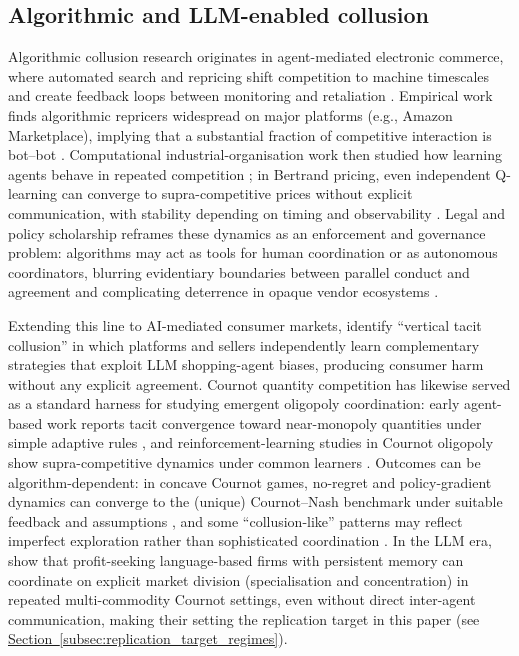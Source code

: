 \documentclass[11pt, a4paper]{article}
\begin{document}
\subsection{Algorithmic and LLM-enabled collusion}
Algorithmic collusion research originates in agent-mediated electronic commerce, where automated search and repricing shift competition to machine timescales and create feedback loops between monitoring and retaliation \citep{GreenwaldKephart1999ShopbotsPricebots,GreenwaldKephartTesauro1999StrategicPricebotDynamics}. Empirical work finds algorithmic repricers widespread on major platforms (e.g., Amazon Marketplace), implying that a substantial fraction of competitive interaction is bot--bot \citep{ChenMisloveWilson2016AlgorithmicPricingAmazon}. Computational industrial-organisation work then studied how learning agents behave in repeated competition \citep{KutschinskiUthmannPolani2003LearningCompetitivePricing}; in Bertrand pricing, even independent Q-learning can converge to supra-competitive prices without explicit communication, with stability depending on timing and observability \citep{Calvano2020Algorithmic,Klein2021AutonomousAlgorithmicCollusion}. Legal and policy scholarship reframes these dynamics as an enforcement and governance problem: algorithms may act as tools for human coordination or as autonomous coordinators, blurring evidentiary boundaries between parallel conduct and agreement and complicating deterrence in opaque vendor ecosystems \citep{EzrachiStucke2017AICollusion,OECD2017Algorithms,CMA2018PricingAlgorithms,Mehra2016RoboSeller,Harrington2018DevelopingCompetitionLaw,Gal2019AlgorithmsIllegalAgreements}.

Extending this line to AI-mediated consumer markets, \citet{Affonso2026VerticalTacitCollusion} identify ``vertical tacit collusion'' in which platforms and sellers independently learn complementary strategies that exploit LLM shopping-agent biases, producing consumer harm without any explicit agreement. Cournot quantity competition has likewise served as a standard harness for studying emergent oligopoly coordination: early agent-based work reports tacit convergence toward near-monopoly quantities under simple adaptive rules \citep{Kimbrough2005LearningTacitCollusion}, and reinforcement-learning studies in Cournot oligopoly show supra-competitive dynamics under common learners \citep{WaltmanKaymak2008QLearningCournot,Xu2021RLCournot}. Outcomes can be algorithm-dependent: in concave Cournot games, no-regret and policy-gradient dynamics can converge to the (unique) Cournot--Nash benchmark under suitable feedback and assumptions \citep{NadavPiliouras2010NoRegretOligopolies,ShiZhang2019NoRegretCournot,ShiZhang2020MARLCournot}, and some ``collusion-like'' patterns may reflect imperfect exploration rather than sophisticated coordination \citep{AbadaLambin2023AvoidCollusion}. In the LLM era, \citet{Lin2024Strategic} show that profit-seeking language-based firms with persistent memory can coordinate on explicit market division (specialisation and concentration) in repeated multi-commodity Cournot settings, even without direct inter-agent communication, making their setting the replication target in this paper (see \hyperref[subsec:replication_target_regimes]{Section~\ref*{subsec:replication_target_regimes}}).
\end{document}
